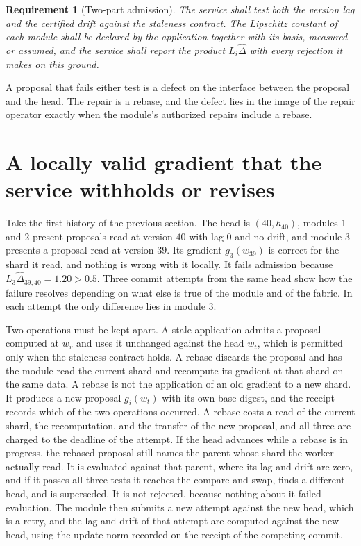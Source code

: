 \documentclass[11pt,openany]{book}
\newtheorem{requirement}{Requirement}[chapter]
\theoremstyle{remark}
\begin{document}
\begin{requirement}[Two-part admission]
The service shall test both the version lag and the certified drift against the staleness contract. The Lipschitz constant of each module shall be declared by the application together with its basis, measured or assumed, and the service shall report the product $L_i\hat\Delta$ with every rejection it makes on this ground.
\end{requirement}

A proposal that fails either test is a defect on the interface between the proposal and the head. The repair is a rebase, and the defect lies in the image of the repair operator exactly when the module's authorized repairs include a rebase.

\section[A locally valid gradient withheld or revised]{A locally valid gradient that the service withholds or revises}

Take the first history of the previous section. The head is $(40,h_{40})$, modules 1 and 2 present proposals read at version $40$ with lag $0$ and no drift, and module 3 presents a proposal read at version $39$. Its gradient $g_3(w_{39})$ is correct for the shard it read, and nothing is wrong with it locally. It fails admission because $L_3\hat\Delta_{39,40}=1.20>0.5$. Three commit attempts from the same head show how the failure resolves depending on what else is true of the module and of the fabric. In each attempt the only difference lies in module 3.

Two operations must be kept apart. A stale application admits a proposal computed at $w_v$ and uses it unchanged against the head $w_t$, which is permitted only when the staleness contract holds. A rebase discards the proposal and has the module read the current shard and recompute its gradient at that shard on the same data. A rebase is not the application of an old gradient to a new shard. It produces a new proposal $g_i(w_t)$ with its own base digest, and the receipt records which of the two operations occurred. A rebase costs a read of the current shard, the recomputation, and the transfer of the new proposal, and all three are charged to the deadline of the attempt. If the head advances while a rebase is in progress, the rebased proposal still names the parent whose shard the worker actually read. It is evaluated against that parent, where its lag and drift are zero, and if it passes all three tests it reaches the compare-and-swap, finds a different head, and is superseded. It is not rejected, because nothing about it failed evaluation. The module then submits a new attempt against the new head, which is a retry, and the lag and drift of that attempt are computed against the new head, using the update norm recorded on the receipt of the competing commit.
\end{document}
